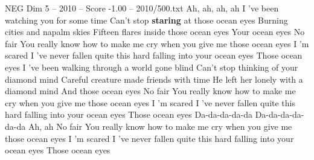 \begin{textsample}{NEG Dim 5 – 2010 – Score -1.00 – 2010/500.txt}  \label{ex:f5_neg_017}
Ah, ah, ah, ah I 've been watching you for some time Can't stop \textbf{staring} at those ocean eyes Burning cities and napalm skies Fifteen flares inside those ocean eyes Your ocean eyes No fair You really know how to make me cry when you give me those ocean eyes I 'm scared I 've never fallen quite this hard falling into your ocean eyes Those ocean eyes I 've been walking through a world gone blind Can't stop thinking of your diamond mind Careful creature made friends with time He left her lonely with a diamond mind And those ocean eyes No fair You really know how to make me cry when you give me those ocean eyes I 'm scared I 've never fallen quite this hard falling into your ocean eyes Those ocean eyes Da-da-da-da-da Da-da-da-da-da-da Ah, ah No fair You really know how to make me cry when you give me those ocean eyes I 'm scared I 've never fallen quite this hard falling into your ocean eyes Those ocean eyes

\end{textsample}
